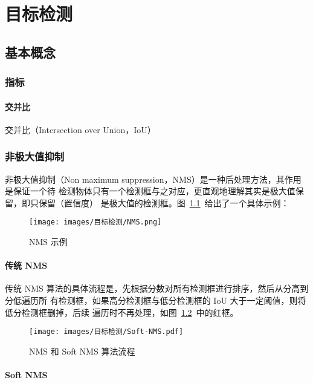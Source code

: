 \part{目标检测}
\chapter{基本概念}

\section{指标}

\subsection{交并比}
交并比（Intersection over Union，IoU）

\section{非极大值抑制}

非极大值抑制（Non maximum suppression，NMS）是一种后处理方法，其作用是保证一个待
检测物体只有一个检测框与之对应，更直观地理解其实是极大值保留，即只保留（置信度）
是极大值的检测框。图~\ref{fig:nms}~给出了一个具体示例：

\begin{figure}[ht]
  \centering
  \texttt{[image: images/目标检测/NMS.png]}
  \caption{NMS 示例}
  \label{fig:nms}
\end{figure}

\subsection{传统 NMS}

传统 NMS 算法的具体流程是，先根据分数对所有检测框进行排序，然后从分高到分低遍历所
有检测框，如果高分检测框与低分检测框的 IoU 大于一定阈值，则将低分检测框删掉，后续
遍历时不再处理，如图~\ref{fig:nms-algo}~中的红框。

\begin{figure}[ht]
  \centering
  \texttt{[image: images/目标检测/Soft-NMS.pdf]}
  \caption{NMS 和 Soft NMS 算法流程}
  \label{fig:nms-algo}
\end{figure}

\subsection{Soft NMS}

